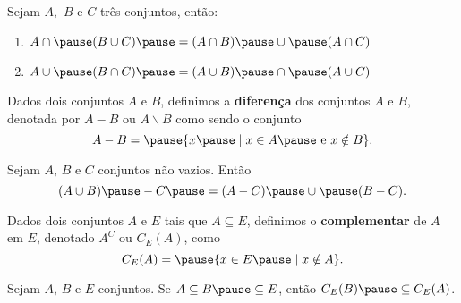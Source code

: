 \documentclass{beamer}
\begin{document}
    \begin{frame}
        \begin{proposicao} Sejam $A,$ $B$ e $C$ três conjuntos, \pause então:\pause
            \begin{enumerate}[label={\roman*})]
                \item $A \cap \pause ( B \cup C) \pause = (A \cap B) \pause \cup \pause (A \cap C)$\pause
                \item $A \cup \pause (B \cap C) \pause = (A \cup B) \pause \cap \pause (A \cup C)$\pause
            \end{enumerate}
        \end{proposicao}
    \end{frame}

    \begin{frame}
        \begin{definicao}
            Dados dois conjuntos $A$ e $B$, \pause definimos a \textbf{diferença} \pause dos conjuntos $A$ e $B$, denotada por \pause $A - B$ ou $A \backslash B$ \pause como sendo o conjunto\pause
            \[
                A - B = \pause \{x \pause \mid x \in A \pause \mbox{ e } x \notin B\}.
            \]
        \end{definicao}

    \end{frame}

    \begin{frame}
        \begin{proposicao}
            Sejam $A$, $B$ e $C$ \pause conjuntos não vazios. Então\pause
            \[
                (A \cup B) \pause - C \pause = (A - C) \pause \cup \pause (B - C).
            \]
        \end{proposicao}
    \end{frame}

    \begin{frame}
        \begin{definicao}
        Dados dois conjuntos $A$ e $E$ \pause tais que $A\subseteq E$, \pause definimos o \textbf{complementar} \pause de $A$ em $E$, denotado $A^C$ ou $C_E(A)$, como\pause
        \[
            C_E(A) = \pause \{ x \in E \pause \mid x \notin A \}.
        \]
        \end{definicao}
    \end{frame}

    \begin{frame}
        \begin{proposicao}
            Sejam $A$, $B$ e $E$ conjuntos. \pause Se $A\subseteq B \pause \subseteq E$, \pause então $C_E(B) \pause \subseteq C_E(A)$.
        \end{proposicao}
    \end{frame}
\end{document}
